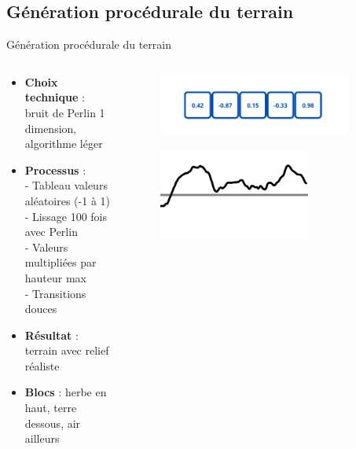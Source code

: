\documentclass[aspectratio=169]{beamer}
\begin{document}
\subsection{Génération procédurale du terrain}

\begin{frame}{Génération procédurale du terrain}
    \begin{columns}
        \centering
        \begin{column}{0.5\textwidth}
            \centering
            \begin{itemize}
                \item \textbf{Choix technique} : bruit de Perlin 1 dimension, algorithme léger
                \item \textbf{Processus} :\\
                    - Tableau valeurs aléatoires (-1 à 1)\\
                    - Lissage 100 fois avec Perlin\\
                    - Valeurs multipliées par hauteur max\\
                    - Transitions douces
                \item \textbf{Résultat} : terrain avec relief réaliste
                \item \textbf{Blocs} : herbe en haut, terre dessous, air ailleurs\\
            \end{itemize}
        \end{column}
        \begin{column}{0.5\textwidth}
            \centering
            \begin{figure}
                \centering
                \includegraphics[width=0.9\textwidth]{assets/tableau.png}
            \end{figure}
            \begin{figure}
                \centering
                \includegraphics[width=0.7\textwidth]{assets/PerlinNoise1d.png}
            \end{figure}
        \end{column}
    \end{columns}
\end{frame}
\end{document}

